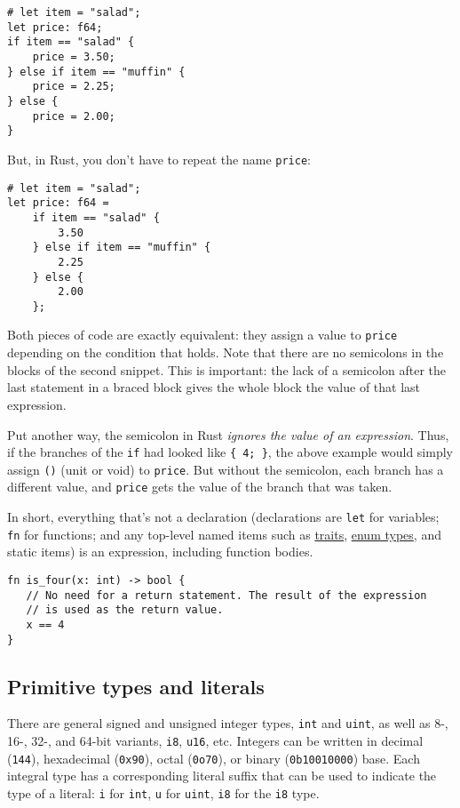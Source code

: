 \documentclass[]{article}
\begin{document}
\begin{verbatim}
# let item = "salad";
let price: f64;
if item == "salad" {
    price = 3.50;
} else if item == "muffin" {
    price = 2.25;
} else {
    price = 2.00;
}
\end{verbatim}

But, in Rust, you don't have to repeat the name \texttt{price}:

\begin{verbatim}
# let item = "salad";
let price: f64 =
    if item == "salad" {
        3.50
    } else if item == "muffin" {
        2.25
    } else {
        2.00
    };
\end{verbatim}

Both pieces of code are exactly equivalent: they assign a value to
\texttt{price} depending on the condition that holds. Note that there
are no semicolons in the blocks of the second snippet. This is
important: the lack of a semicolon after the last statement in a braced
block gives the whole block the value of that last expression.

Put another way, the semicolon in Rust \emph{ignores the value of an
expression}. Thus, if the branches of the \texttt{if} had looked like
\texttt{\{ 4; \}}, the above example would simply assign \texttt{()}
(unit or void) to \texttt{price}. But without the semicolon, each branch
has a different value, and \texttt{price} gets the value of the branch
that was taken.

In short, everything that's not a declaration (declarations are
\texttt{let} for variables; \texttt{fn} for functions; and any top-level
named items such as \hyperref[traits]{traits}, \hyperref[enums]{enum
types}, and static items) is an expression, including function bodies.

\begin{verbatim}
fn is_four(x: int) -> bool {
   // No need for a return statement. The result of the expression
   // is used as the return value.
   x == 4
}
\end{verbatim}

\subsection{Primitive types and
literals}\label{primitive-types-and-literals}

There are general signed and unsigned integer types, \texttt{int} and
\texttt{uint}, as well as 8-, 16-, 32-, and 64-bit variants,
\texttt{i8}, \texttt{u16}, etc. Integers can be written in decimal
(\texttt{144}), hexadecimal (\texttt{0x90}), octal (\texttt{0o70}), or
binary (\texttt{0b10010000}) base. Each integral type has a
corresponding literal suffix that can be used to indicate the type of a
literal: \texttt{i} for \texttt{int}, \texttt{u} for \texttt{uint},
\texttt{i8} for the \texttt{i8} type.
\end{document}
